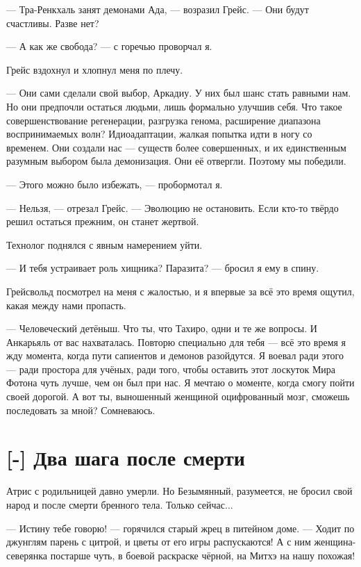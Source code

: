 --- Тра-Ренкхаль занят демонами Ада, --- возразил Грейс.
--- Они будут счастливы.
Разве нет?

--- А как же свобода? --- с горечью проворчал я.

Грейс вздохнул и хлопнул меня по плечу.

--- Они сами сделали свой выбор, Аркадиу.
У них был шанс стать равными нам.
Но они предпочли остаться людьми, лишь формально улучшив себя.
Что такое совершенствование регенерации, разгрузка генома, расширение диапазона воспринимаемых волн?
Идиоадаптации, жалкая попытка идти в ногу со временем.
Они создали нас --- существ более совершенных, и их единственным разумным выбором была демонизация.
Они её отвергли.
Поэтому мы победили.

--- Этого можно было избежать, --- пробормотал я.

--- Нельзя, --- отрезал Грейс.
--- Эволюцию не остановить.
Если кто-то твёрдо решил остаться прежним, он станет жертвой.

Технолог поднялся с явным намерением уйти.

--- И тебя устраивает роль хищника?
Паразита? --- бросил я ему в спину.

Грейсвольд посмотрел на меня с жалостью, и я впервые за всё это время ощутил, какая между нами пропасть.

--- Человеческий детёныш.
Что ты, что Тахиро, одни и те же вопросы.
И Анкарьяль от вас нахваталась.
Повторю специально для тебя --- всё это время я жду момента, когда пути сапиентов и демонов разойдутся.
Я воевал ради этого --- ради простора для учёных, ради того, чтобы оставить этот лоскуток Мира Фотона чуть лучше, чем он был при нас.
Я мечтаю о моменте, когда смогу пойти своей дорогой.
А вот ты, выношенный женщиной оцифрованный мозг, сможешь последовать за мной?
Сомневаюсь.

\section{[-] Два шага после смерти}

\textspace

Атрис с родильницей давно умерли.
Но Безымянный, разумеется, не бросил свой народ и после смерти бренного тела.
Только сейчас...

--- Истину тебе говорю! --- горячился старый жрец в питейном доме.
--- Ходит по джунглям парень с цитрой, и цветы от его игры распускаются!
А с ним женщина-северянка постарше чуть, в боевой раскраске чёрной, на Митхэ на нашу похожая!

